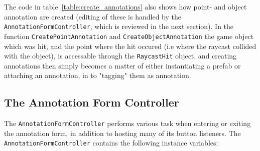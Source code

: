 The code in table~\vref{table:create_annotations} also shows how point- and object annotation are created (editing of these is handled by the \texttt{AnnotationFormController}, 
which is reviewed in the next section). In the function \texttt{CreatePointAnnotation} and \texttt{CreateObjectAnnotation} the game object which was hit, and the point where the
hit occured (i.e where the raycast collided with the object), is accessable through the \texttt{RaycastHit} object, and creating annotations then simply becomes a 
matter of either instantiating a prefab or attaching an annotation, in to "tagging" them as annotation. 



\subsection{The Annotation Form Controller}
The \texttt{AnnotationFormController} performs various task when entering or exiting the annotation form, in addition to hosting many of its button listeners.
The \texttt{AnnotationFormController} contains the following instance variables:

